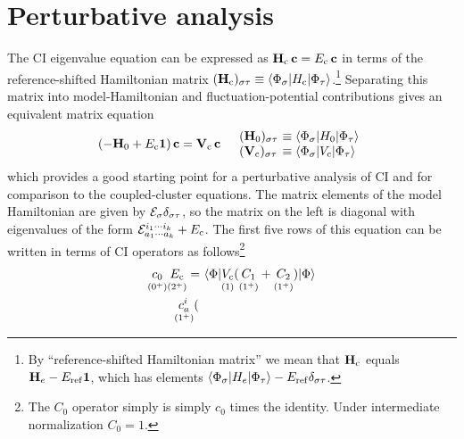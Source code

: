 \documentclass[11pt]{article}
\numberwithin{equation}{section}
\begin{document}
\setlength{\abovedisplayskip}{3pt}
\setlength{\belowdisplayskip}{3pt}



\setcounter{section}{6}
\section{Perturbative analysis}

\begin{rmk}
The CI eigenvalue equation can be expressed as
$
  \mathbf{H}_{\mathrm{c}}\,
  \mathbf{c}
=
  E_{\mathrm{c}}\,
  \mathbf{c}
$
in terms of the reference-shifted Hamiltonian matrix
$
  (\mathbf{H}_{\mathrm{c}})_{\sigma \tau }
\equiv
  \langle\Phi _{\sigma }|H_{\mathrm{c}}|\Phi _{\tau }\rangle
$.\footnote{By ``reference-shifted Hamiltonian matrix'' we mean that 
$
  \mathbf{H}_{\mathrm{c}}
$
equals
$
  \mathbf{H}_e - E_{\mathrm{ref}}\mathbf{1}
$,
which has elements
$
  \langle\Phi _{\sigma }|H_e|\Phi _{\tau }\rangle
-
  E_{\mathrm{ref}}
  \delta _{\sigma \tau }
$.
}
Separating this matrix into model-Hamiltonian and fluctuation-potential contributions gives an equivalent matrix equation
\begin{align}
  (
  -
    \bo{H}_0
  +
    E_\mr{c}
    \bo{1}
  )\,
  \bo{c}
=
  \bo{V}_\mr{c}\,
  \bo{c}
&&
\begin{array}{l@{\ }l}
  (\bo{H}_0)_{\si\ta}
&\equiv
  \ip{\F_\si|H_0|\F_\ta}
\\
  (\bo{V}_\mr{c})_{\si\ta}
&\equiv
  \ip{\F_\si|V_\mr{c}|\F_\ta}
\end{array}
\end{align}
which provides a good starting point for a perturbative analysis of CI and for comparison to the coupled-cluster equations.
The matrix elements of the model Hamiltonian are given by
$
  \mathcal{E}_{\sigma }
  \delta _{\sigma \tau }
$,
so the matrix on the left is diagonal with eigenvalues of the form
$
  \mathcal{E}_{a_1\cdots a_k}^{i_1\cdots i_k}
+
  E_{\mathrm{c}}
$.
The first five rows of this equation can be written in terms of CI operators as follows\footnote{The $C_0$ operator simply is simply $c_0$ times the identity.  Under intermediate normalization $C_0=1$.}
\begin{align}
\label{eq:ci-reference-equation}
  \underset{(0^+)}{\vphantom{(}
  c_0
  }
  \underset{(2^+)}{\vphantom{(}
    E_\mr{c}
  }
=&\
  \ip{\F|
  \underset{(1)}{\vphantom{(}
    V_\mr{c}
  }
    (
    \underset{(1^+)}{\vphantom{(}
      C_1
    }
    +
    \underset{(1^+)}{\vphantom{(}
      C_2
    }
    )
  |\F}
\\
\label{eq:ci-singles-equation}
  \underset{(1^+)}{\vphantom{(}
  c_a^i
  }
  (\hspace{1pt}

\end{align}
\end{rmk}
\end{document}
